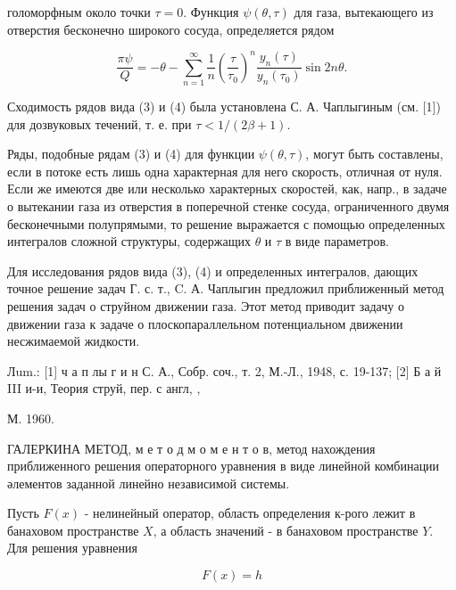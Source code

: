 \documentclass[10pt]{article}
\begin{document}
голоморфным около точки $\tau=0$. Функция $\psi(\theta, \tau)$ для газа, вытекающего из отверстия бесконечно широкого сосуда, определяется рядом



\[

\frac{\pi \psi}{Q}=-\theta-\sum_{n=1}^{\infty} \frac{1}{n}\left(\frac{\tau}{\tau_{0}}\right)^{n} \frac{y_{n}(\tau)}{y_{n}\left(\tau_{0}\right)} \sin 2 n \theta .

\]



Сходимость рядов вида (3) и (4) была установлена С. А. Чаплыгиным (см. [1]) для дозвуковых течений, т. е. при $\tau<1 /(2 \beta+1)$.



Ряды, подобные рядам (3) и (4) для функции $\psi(\theta, \tau)$, могут быть составлены, если в потоке есть лишь одна характерная для него скорость, отличная от нуля. Если же имеются две или несколько характерных скоростей, как, напр., в задаче о вытекании газа из отверстия в поперечной стенке сосуда, ограниченного двумя бесконечными полупрямыми, то решение выражается с помощью определенных интегралов сложной структуры, содержащих $\theta$ и $\tau$ в виде параметров.



Для исследования рядов вида (3), (4) и определенных интегралов, дающих точное решение задач Г. с. т., C. А. Чаплыгин предложил приближенный метод решения задач о струйном движении газа. Этот метод приводит задачу о движении газа к задаче о плоскопараллельном потенциальном движении несжимаемой жидкости.



Лum.: [1] ч а п лы г и н С. А., Собр. соч., т. 2, М.-Л., 1948, с. 19-137; [2] Б а й III и-и, Теория струй, пер. с англ, ,

М. 1960.



ГАЛЕРКИНА МЕТОД, м е т о д м о м е н т о в, метод нахождения приближенного решения операторного уравнения в виде линейной комбинации әлементов заданной линейно независимой системы.



Пусть $F(x)$ - нелинейный оператор, область определения к-рого лежит в банаховом пространстве $X$, а область значений - в банаховом пространстве $Y$. Для решения уравнения



\[

F(x)=h

\]
\end{document}

